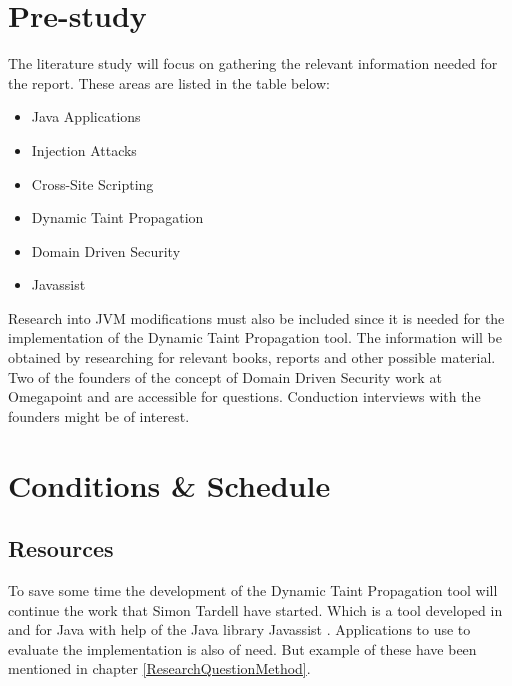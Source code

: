 \documentclass{../kththesis}
\begin{document}
\chapter{Pre-study} \label{Pre-study}
The literature study will focus on gathering the relevant information needed for the report. These areas are listed in the table below:
	
	\begin{itemize}  
		\item Java Applications
		\item Injection Attacks
		\item Cross-Site Scripting
		\item Dynamic Taint Propagation
		\item Domain Driven Security
		\item Javassist
	\end{itemize}

\noindent
Research into JVM modifications must also be included since it is needed for the implementation of the Dynamic Taint Propagation tool. The information will be obtained by researching for relevant books, reports and other possible material. Two of the founders of the concept of Domain Driven Security work at Omegapoint and are accessible for questions. Conduction interviews with the founders might be of interest.



\chapter{Conditions \& Schedule}
\section{Resources}
To save some time the development of the Dynamic Taint Propagation tool will continue the work that Simon Tardell have started. Which is a tool developed in and for Java with help of the Java library Javassist \parencite{Javassist}. Applications to use to evaluate the implementation is also of need. But example of these have been mentioned in chapter \ref{ResearchQuestionMethod}.
\end{document}
